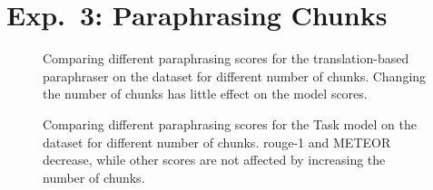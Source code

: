 \section{Exp.\ 3: Paraphrasing Chunks}
\label{sec:app_chunks}

\begin{figure}[H]
    \centering
    
    \caption[Paraphrasing scores for the translation-based paraphraser.]{Comparing different paraphrasing scores for the translation-based paraphraser on the \dataGutenberg{} dataset for different number of chunks. 
    Changing the number of chunks has little effect on the model scores.}
    \label{fig:abl_chunks_gutenberg_translation}
\end{figure}

\begin{figure}[H]
    \centering
    
    \caption[Paraphrasing scores for the Task model.]{Comparing different paraphrasing scores for the Task model on the \dataStudent{} dataset for different number of chunks. 
    \ac{rouge}-1 and METEOR decrease, while other scores are not affected by increasing the number of chunks.}
    \label{fig:abl_chunks_student_essays_task}
\end{figure}